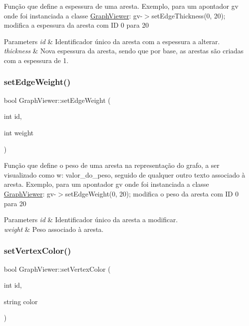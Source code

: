 Função que define a espessura de uma aresta. Exemplo, para um apontador gv onde foi instanciada a classe \mbox{\hyperlink{class_graph_viewer}{Graph\+Viewer}}\+: gv-\/$>$set\+Edge\+Thickness(0, 20); modifica a espessura da aresta com ID 0 para 20


\begin{DoxyParams}{Parameters}
{\em id} & Identificador único da aresta com a espessura a alterar. \\
\hline
{\em thickness} & Nova espessura da aresta, sendo que por base, as arestas são criadas com a espessura de 1. \\
\hline
\end{DoxyParams}
\mbox{\label{class_graph_viewer_ac211de009a0afe2e6d44f4f8d030a2cc}} 
\subsubsection{\texorpdfstring{set\+Edge\+Weight()}{setEdgeWeight()}}
{\footnotesize\ttfamily bool Graph\+Viewer\+::set\+Edge\+Weight (\begin{DoxyParamCaption}\item[{int}]{id,  }\item[{int}]{weight }\end{DoxyParamCaption})}

Função que define o peso de uma aresta na representação do grafo, a ser visualizado como w\+: valor\+\_\+do\+\_\+peso, seguido de qualquer outro texto associado à aresta. Exemplo, para um apontador gv onde foi instanciada a classe \mbox{\hyperlink{class_graph_viewer}{Graph\+Viewer}}\+: gv-\/$>$set\+Edge\+Weight(0, 20); modifica o peso da aresta com ID 0 para 20


\begin{DoxyParams}{Parameters}
{\em id} & Identificador único da aresta a modificar. \\
\hline
{\em weight} & Peso associado à aresta. \\
\hline
\end{DoxyParams}
\mbox{\label{class_graph_viewer_a8b542d7e09e81a45a74760c19233beb0}} 
\subsubsection{\texorpdfstring{set\+Vertex\+Color()}{setVertexColor()}}
{\footnotesize\ttfamily bool Graph\+Viewer\+::set\+Vertex\+Color (\begin{DoxyParamCaption}\item[{int}]{id,  }\item[{string}]{color }\end{DoxyParamCaption})}

